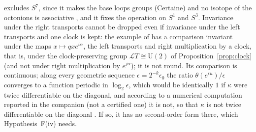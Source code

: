 \documentclass[aps,pra,onecolumn,superscriptaddress,nofootinbib,10pt]{revtex4-2}
\theoremstyle{definition}
\theoremstyle{remark}
\newcommand{\cL}{\mathcal{L}}
\newcommand{\U}{\mathrm{U}}
\begin{document}
excludes $S^7$, since it makes the base loops groups (Certaine) and no isotope of the octonions is
associative \cite[Rem.~5.25]{PaperI}, and it fixes the operation on $S^1$ and $S^3$.  Invariance under the right
transports cannot be dropped even if invariance under the left transports and one clock is kept: the
example of \cite[Prop.~5.26]{PaperI} has a comparison invariant under the maps $x\mapsto qxe^{i\alpha}$, the left
transports and right multiplication by a clock, that is, under the clock-preserving group $\cL T\cong\U(2)$ of
Proposition~\ref{prop:clock} (and not under right multiplication by $e^{j\alpha}$); it is not round.  Its comparison
is continuous; along every geometric sequence $\epsilon=2^{-k}\epsilon_0$ the ratio $\theta(e^{\epsilon u})/\epsilon$ converges to a
function periodic in $\log_2\epsilon$, which would be identically $1$ if $\kappa$ were twice differentiable on the
diagonal, and according to a numerical computation reported in the companion (not a certified one) it
is not, so that $\kappa$ is not twice differentiable on the diagonal \cite[Prop.~5.26(iv), Rem.~5.29]{PaperI}.  If so, it
has no second-order form there, which Hypothesis~F(iv) needs.
\end{document}
